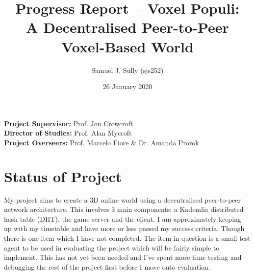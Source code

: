 \documentclass[11pt,a4paper]{article}
\begin{document}
	\title{Progress Report -- Voxel Populi:\\ A Decentralised Peer-to-Peer Voxel-Based World}
	\author{Samuel J. Sully (sjs252)}
	\date{26 January 2020}
	\maketitle
	\thispagestyle{empty}
	
	\noindent
	\textbf{Project Supervisor:} Prof. Jon Crowcroft\\
	\textbf{Director of Studies:} Prof. Alan Mycroft\\
	\textbf{Project Overseers:} Prof. Marcelo Fiore \&  Dr. Amanda Prorok

	\section{Status of Project}
	My project aims to create a 3D online world using a decentralised peer-to-peer network architecture. This involves 3 main components: a Kademlia distributed hash table (DHT), the game server and the client. I am approximately keeping up with my timetable and have more or less passed my success criteria. Though there is one item which I have not completed. The item in question is a small test agent to be used in evaluating the project which will be fairly simple to implement. This has not yet been needed and I've spent more time testing and debugging the rest of the project first before I move onto evaluation.
	
\end{document}
